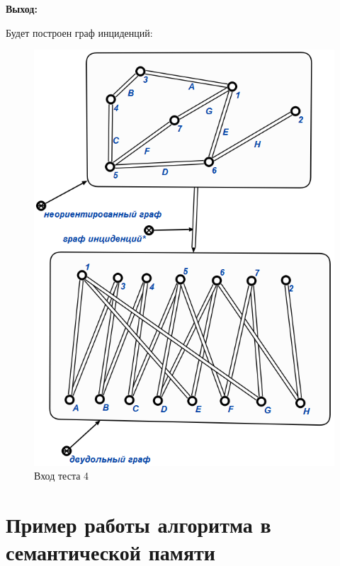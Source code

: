 \textbf{Выход:}

Будет построен граф инциденций:

\begin{figure}[H]
  \centering
  \includegraphics[scale=0.7]{images/22.png}
  \caption{Вход теста 4}
\end{figure}

\section{Пример работы алгоритма в семантической памяти}

